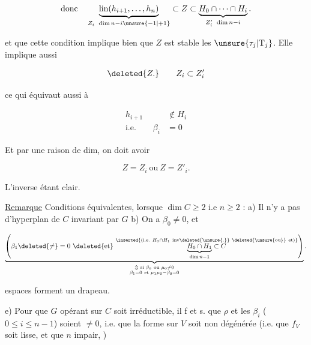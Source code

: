 
\[
\text{donc}\quad
\underbrace{\operatorname{lin}(h_{i+1},\ldots,h_n)}_{Z_i\ \dim n-i\unsure{-1|+1}}
 \subset Z\subset
\underbrace{H_0\cap\cdots\cap H_i}_{Z'_i\ \dim n-i}.
\]

 et que cette condition implique bien que $Z$ est stable  les $\unsure{\tau_j|\mathrm T_j}$. Elle implique aussi

\[
\deleted{Z.}\qquad Z_i\subset Z'_i
\]

ce qui équivaut aussi à

\[
\begin{aligned}
 h_{i+1}&\notin H_i\\
 \text{i.e.}\qquad \beta_i&=0
\end{aligned}
\]


Et par une raison de dim, on doit avoir

\[
Z=Z_i\ \text{ou}\ Z=Z'_i.
\]

L'inverse étant clair.

\uline{Remarque} Conditions équivalentes, lorsque $\dim C\geqslant 2$ i.e $n\geqslant 2$ : a) Il n'y a pas d'hyperplan de $C$ invariant par $G$ b) On  a  $\beta_0\ne0$, et  

\[
\underbrace{\left(\beta_1\deleted{\ne}=0\
 \deleted{\text{et}}\ 
 \overset{\inserted{\text{(i.e. }H_0\cap H_1\ \text{inv}\deleted{\unsure{.}}\ \deleted{\unsure{\text{ou}}}\ \text{et)}}}
 {\underbrace{H_0\cap H_1}_{\dim n-1}\subset C}\right)}
 _{\substack{\Updownarrow\ \text{si }\beta_0\ \text{ou }\mu_0\ne0\\
 \beta_1=0\ \text{et }\mu_1\mu_0-\beta_0=0}}.
\]


espaces forment un drapeau.

e) Pour que $G$ opérant sur $C$ soit irréductible, il f et s. que $\rho$ et les $\beta_i$ ($0\leq i\leq n-1$) soient $\ne0$, i.e. que  la forme   sur $V$ soit  non dégénérée (i.e. que $f_V$ soit lisse, et que   $n$ impair,  )

